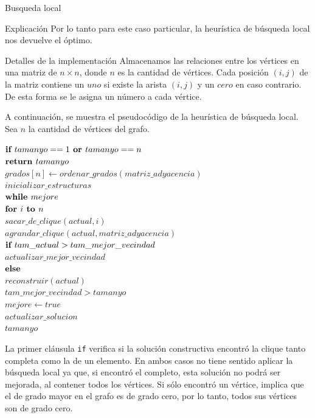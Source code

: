 \begin{section}{Busqueda local}
\begin{subsection}{Explicación}
			Por lo tanto para este caso particular, la heurística de búsqueda local nos devuelve el óptimo.


		\end{subsection}
		\begin{subsection}{Detalles de la implementación}
			Almacenamos las relaciones entre los vértices en una matriz de $n \times n$, donde $n$ es la cantidad de vértices. Cada posición $(i,j)$ de la matriz contiene un $uno$ si existe la arista $(i,j)$ y un $cero$ en caso contrario. De esta forma se le asigna un número a cada vértice.\VSP

			A continuación, se muestra el pseudocódigo de la heurística de búsqueda local.\\

			Sea $n$ la cantidad de vértices del grafo.

			\begin{pseudo}
				\tab $\textbf{if } tamanyo==1 \textbf{ or } tamanyo==n$\\
				\tab \tab $\textbf{return } tamanyo$\\
				\tab $grados[n] \leftarrow ordenar\_grados(matriz\_adyacencia)$\\
				\tab $inicializar\_estructuras$\\
				\tab $\textbf{while } mejore$\\
				\tab \tab $\textbf{for } i \textbf{ to } n$\\
				\tab \tab \tab $sacar\_de\_clique(actual,i)$\\
				\tab \tab \tab $agrandar\_clique(actual,matriz\_adyacencia)$\\
				\tab \tab \tab$\textbf{if } tam\_actual>tam\_mejor\_vecindad$\\
				\tab \tab \tab \tab $actualizar\_mejor\_vecindad$\\
				\tab \tab \tab$\textbf{else }$\\
				\tab \tab \tab \tab $reconstruir(actual)$\\
				\tab \tab \IF $tam\_mejor\_vecindad>tamanyo$\\
				\tab \tab \tab $mejore 	\leftarrow true$\\
				\tab \tab \tab $actualizar\_solucion$\\
				\tab \RET $tamanyo$\\
			\end{pseudo}

		La primer cláusula \texttt{if} verifica si la solución constructiva encontró la clique tanto completa como la de un elemento. En ambos casos no tiene sentido aplicar la búsqueda local ya que, si encontró el completo, esta solución no podrá ser mejorada, al contener todos los vértices. Si sólo encontró un vértice, implica que el de grado mayor en el grafo es de grado cero, por lo tanto, todos sus vértices son de grado cero. 


\end{subsection}
\end{section}
